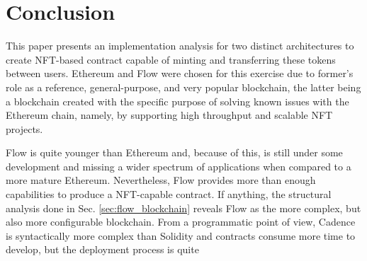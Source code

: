 \documentclass[../NFTComp_IEEE.tex]{subfiles}
\begin{document}
\section{Conclusion}
\label{sec:conclusion}
This paper presents an implementation analysis for two distinct architectures to create NFT-based contract capable of minting and transferring these tokens between users. Ethereum and Flow were chosen for this exercise due to former's role as a reference, general-purpose, and very popular blockchain, the latter being a blockchain created with the specific purpose of solving known issues with the Ethereum chain, namely, by supporting high throughput and scalable NFT projects.
\par
Flow is quite younger than Ethereum and, because of this, is still under some development and missing a wider spectrum of applications when compared to a more mature Ethereum. Nevertheless, Flow provides more than enough capabilities to produce a NFT-capable contract. If anything, the structural analysis done in Sec. \ref{sec:flow_blockchain} reveals Flow as the more complex, but also more configurable blockchain. From a programmatic point of view, Cadence is syntactically more complex than Solidity and contracts consume more time to develop, but the deployment process is quite
\end{document}
